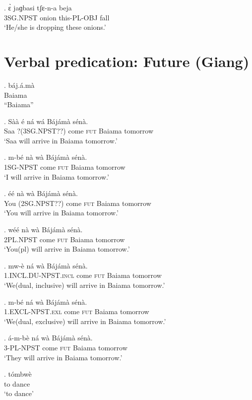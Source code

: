 \documentclass{assets/fieldnotes}
\begin{document}
{\exg.
ɛ̀         jaɡbasi   tʃɛ-n-a       beja \\
3SG.NPST   onion     this-PL-OBJ   fall \\%
`He/she is dropping these onions.'


\section{Verbal predication: Future (Giang)} %



\exg. báj.á.mà\\
Baiama\\
``Baiama''

\exg. Sàà é ná wá Bájámà sénà.\\
Saa ?(3SG.NPST??) come \textsc{fut} Baiama tomorrow\\
`Saa will arrive in Baiama tomorrow.' 


\exg. m-bé nà wà Bájámà sénà.\\
1\textsc{SG-NPST} come \textsc{fut} Baiama tomorrow\\
`I will arrive in Baiama tomorrow.'

\exg. éé nà wà Bájámà sénà.\\
You (2SG.NPST??) come \textsc{fut} Baiama tomorrow\\
`You will arrive in Baiama tomorrow.'

\exg. wéé nà wà Bájámà sénà.\\
2\textsc{PL.NPST} come \textsc{fut} Baiama tomorrow\\
`You(pl) will arrive in Baiama tomorrow.'

\exg. mw-è ná wà Bájámà sénà.\\
1.\textsc{INCL.DU-NPST}.\textsc{incl} come \textsc{fut} Baiama tomorrow\\
`We(dual, inclusive) will arrive in Baiama tomorrow.'

\exg. m-bé ná wà Bájámà sénà.\\
1.\textsc{EXCL-NPST}.\textsc{exl} come \textsc{fut} Baiama tomorrow\\
`We(dual, exclusive) will arrive in Baiama tomorrow.'

\exg. á-m-bè ná wà Bájámà sénà.\\
3-\textsc{PL-NPST} come \textsc{fut} Baiama tomorrow\\
`They will arrive in Baiama tomorrow.'


\exg. tómbwè\\
to dance\\
`to dance'

}
\end{document}
